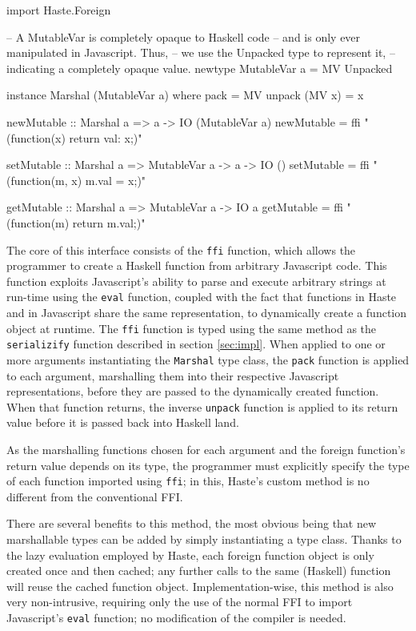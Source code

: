 \documentclass[preprint]{sigplanconf}
\begin{document}
\begin{listingfloat}
\begin{code}
import Haste.Foreign

-- A MutableVar is completely opaque to Haskell code
-- and is only ever manipulated in Javascript. Thus,
-- we use the Unpacked type to represent it,
-- indicating a completely opaque value.
newtype MutableVar a = MV Unpacked

instance Marshal (MutableVar a) where
  pack          = MV
  unpack (MV x) = x

newMutable :: Marshal a => a -> IO (MutableVar a)
newMutable = ffi "(function(x) {return {val: x};})"

setMutable :: Marshal a => MutableVar a -> a -> IO ()
setMutable = ffi "(function(m, x) {m.val = x;})"

getMutable :: Marshal a => MutableVar a -> IO a
getMutable = ffi "(function(m) {return m.val;})"
\end{code}
\caption{Mutable variables with \lstinline!Haste.Foreign!}
\label{lst:ffi}
\end{listingfloat}

The core of this interface consists of the \lstinline!ffi! function, which
allows the programmer to create a Haskell function from arbitrary Javascript
code. This function exploits Javascript's ability to parse and execute
arbitrary strings at run-time using the \lstinline!eval! function, coupled with
the fact that functions in Haste and in Javascript share the same
representation, to dynamically create a function object at runtime.
The \lstinline!ffi! function is typed using the same method as the
\lstinline!serializify! function described in section \ref{sec:impl}.
When applied to one or more arguments instantiating the \lstinline!Marshal!
type class, the \lstinline!pack! function is applied to each argument,
marshalling them into their respective Javascript representations, before they
are passed to the dynamically created function. When that function returns,
the inverse \lstinline!unpack! function is applied to its return value before
it is passed back into Haskell land.

As the marshalling functions chosen for each argument and the foreign
function's return value depends on its type, the programmer must explicitly
specify the type of each function imported using \lstinline!ffi!; in this,
Haste's custom method is no different from the conventional FFI.

There are several benefits to this method, the most obvious being that new
marshallable types can be added by simply instantiating a type class. Thanks
to the lazy evaluation employed by Haste, each foreign function object is only
created once and then cached; any further calls to the same (Haskell) function
will reuse the cached function object. Implementation-wise, this method is also
very non-intrusive, requiring only the use of the normal FFI to import
Javascript's \lstinline!eval! function; no modification of the compiler is
needed.
\end{document}
